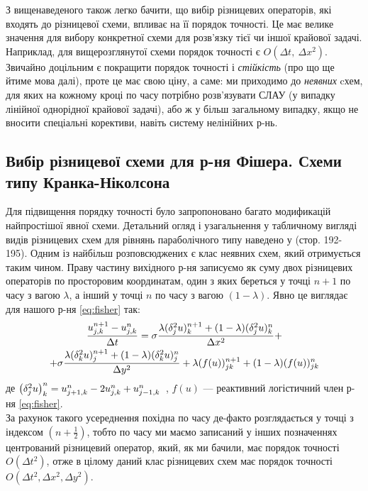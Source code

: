 З вищенаведеного також легко бачити, що вибір різницевих операторів, які входять до різницевої схеми, впливає на її порядок точності. Це має велике значення для вибору конкретної схеми для розв’язку тієї чи іншої крайової задачі. Наприклад, для вищерозглянутої схеми порядок точності є $O\left(\Delta t,\ \Delta x^2\right)$. Звичайно доцільним є покращити порядок точності і \textit{стійкість} (про що ще йтиме мова далі), проте це має свою ціну, а саме: ми приходимо до \textit{неявних} cхем, для яких на кожному кроці по часу потрібно розв’язувати СЛАУ (у випадку лінійної однорідної крайової задачі), або ж у більш загальному випадку, якщо не вносити спеціальні корективи, навіть систему нелінійних р-нь.

\newpage
\subsection{Вибір різницевої схеми для р-ня Фішера. Схеми типу Кранка-Ніколсона}
Для підвищення порядку точності було запропоновано багато модификацій найпростішої явної схеми. Детальний огляд і узагальнення у табличному вигляді видів різницевих схем для рівнянь параболічного типу наведено у \cite{richt} (стор. 192-195).
Одним із найбільш розповсюджених є клас неявних схем, який отримується таким чином. Праву частину вихідного р-ня записуємо як суму двох різницевих операторів по просторовим координатам, один з яких береться у точці $n+1$ по часу з вагою $\lambda$, а інший у точці $n$ по часу з вагою $(1-\lambda)$. Явно це виглядає для нашого р-ня \eqref{eq:fisher} так:
\begin{multline}
\frac{\upl{0}{0} - \un{0}{0}}{\Delta t} = \sigma\frac{\lambda(\delta^2_ju)^{n+1}_k + (1-\lambda)(\delta^2_ju)^{n}_k}{\Delta x^2} + \\ + \sigma\frac{\lambda(\delta^2_ku)^{n+1}_j + (1-\lambda)(\delta^2_ku)^{n}_j}{\Delta y^2} + {\lambda (f(u))^{n+1}_{jk} + (1-\lambda)(f(u))^{n}_{jk}} \label{eq:syst}
\end{multline}
де $\left(\delta^2_ju\right)^{n}_k = \un{1}{0} - 2\un{0}{0} + \un{-1}{0}$\ , $f(u)$ --- реактивний логістичний член р-ня \eqref{eq:fisher}.\\
За рахунок такого усереднення похідна по часу де-факто розглядається у точці з індексом $(n+ \frac{1}{2})$, тобто по часу ми маємо записаний у інших позначеннях центрований різницевий оператор, який, як ми бачили, має порядок точності $O\left(\Delta t^2\right)$, отже в цілому даний клас різницевих схем має порядок точності $O\left(\Delta t^2, \Delta x^2, \Delta y^2\right)$.

